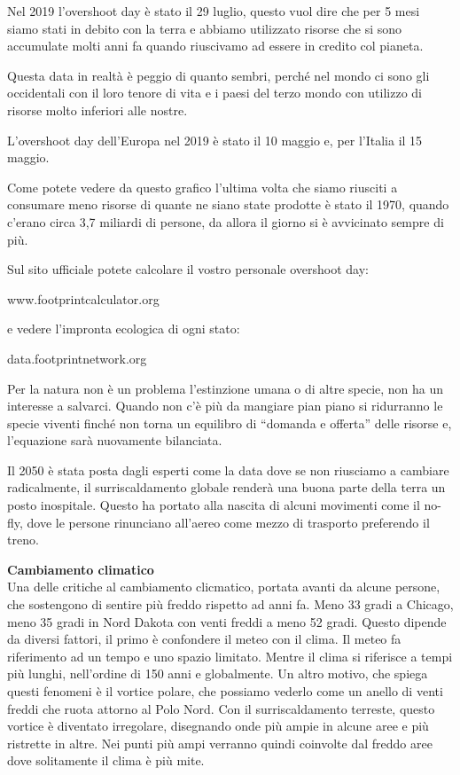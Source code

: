\documentclass[12pt]{book} %
\begin{document}
Nel 2019 l'overshoot day è stato il 29 luglio, questo vuol dire che per 5 mesi siamo stati in
debito con la terra e abbiamo utilizzato risorse che si sono accumulate molti anni fa quando riuscivamo ad essere in
credito col pianeta.

Questa data in realtà è peggio di quanto sembri, perché nel mondo ci sono gli occidentali con il loro tenore di vita e i
paesi del terzo mondo con utilizzo di risorse molto inferiori alle nostre.

L'overshoot day dell'Europa nel 2019 è stato il 10 maggio e, per l'Italia il
15 maggio.

Come potete vedere da questo grafico l'ultima volta che siamo riusciti a consumare meno risorse di
quante ne siano state prodotte è stato il 1970, quando c'erano circa 3,7 miliardi di persone, da
allora il giorno si è avvicinato sempre di
più.

\bigskip

Sul sito ufficiale potete calcolare il vostro personale overshoot day:

www.footprintcalculator.org 

e vedere l'impronta ecologica di ogni stato:

data.footprintnetwork.org


\bigskip



Per la natura non è un problema l'estinzione umana o di altre specie, non ha un interesse a
salvarci. Quando non c'è più da mangiare pian piano si ridurranno le specie viventi finché non
torna un equilibro di “domanda e offerta” delle risorse e, l'equazione sarà nuovamente bilanciata.

\bigskip

Il 2050 è stata posta dagli esperti come la data dove se non riusciamo a cambiare radicalmente, il surriscaldamento
globale renderà una buona parte della terra un posto inospitale. Questo ha portato alla nascita di alcuni movimenti come il no-fly, dove le persone rinunciano all'aereo come mezzo di trasporto
preferendo il treno.

\noindent \textbf{\large Cambiamento climatico} \\
Una delle critiche al cambiamento clicmatico, portata avanti da alcune persone, che sostengono di sentire più freddo rispetto ad anni fa. 
Meno 33 gradi a Chicago, meno 35 gradi in Nord
Dakota con venti freddi a meno 52 gradi. Questo dipende da diversi fattori, il primo è confondere il meteo con il clima. Il meteo fa riferimento ad un tempo e uno spazio limitato. Mentre il clima si riferisce a tempi più lunghi,
nell'ordine di 150 anni e globalmente. Un altro motivo, che spiega questi fenomeni è il vortice polare, che possiamo vederlo come
un anello di venti freddi che ruota attorno al Polo Nord. Con il surriscaldamento terreste, questo vortice è diventato
irregolare, disegnando onde più ampie in alcune aree e più ristrette in altre. Nei punti più ampi verranno quindi
coinvolte dal freddo aree dove solitamente il clima è più mite. 
\end{document}
